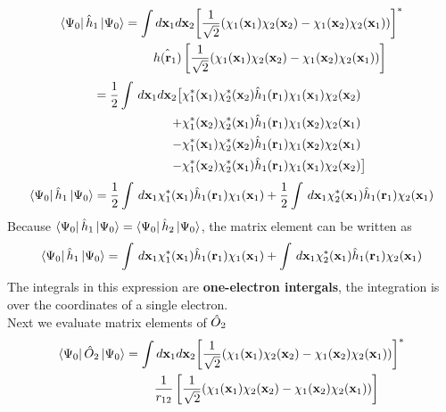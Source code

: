 \documentclass[11pt]{article}
\begin{document}
\begin{align*}
    \bra{\Psi_0}\Hat{h}_1\ket{\Psi_0}=\int&\,d\mathbf{x}_1d\mathbf{x}_2{\left[\frac{1}{\sqrt{2}}(\chi_1(\mathbf{x}_1)\chi_2(\mathbf{x}_2)
    -\chi_1(\mathbf{x}_2)\chi_2(\mathbf{x}_1))\right]}^* \notag \\
    &\Hat{h(\mathbf{r}_1)}\left[\frac{1}{\sqrt{2}}(\chi_1(\mathbf{x}_1)\chi_2(\mathbf{x}_2)
    -\chi_1(\mathbf{x}_2)\chi_2(\mathbf{x}_1))\right] \notag \\
\end{align*}
\begin{align*}
    =\frac{1}{2}\int\,d\mathbf{x}_1d\mathbf{x}_2\big[&\chi_1^*(\mathbf{x}_1)\chi_2^*(\mathbf{x}_2)\Hat{h}_1(\mathbf{r}_1)\chi_1(\mathbf{x}_1)\chi_2(\mathbf{x}_2)\notag \\
    +&\chi_1^*(\mathbf{x}_2)\chi_2^*(\mathbf{x}_1)\Hat{h}_1(\mathbf{r}_1)\chi_1(\mathbf{x}_2)\chi_2(\mathbf{x}_1)\notag \\
    -&\chi_1^*(\mathbf{x}_1)\chi_2^*(\mathbf{x}_2)\Hat{h}_1(\mathbf{r}_1)\chi_1(\mathbf{x}_2)\chi_2(\mathbf{x}_1)\notag \\
    -&\chi_1^*(\mathbf{x}_2)\chi_2^*(\mathbf{x}_1)\Hat{h}_1(\mathbf{r}_1)\chi_1(\mathbf{x}_1)\chi_2(\mathbf{x}_2)\big]
\end{align*}
\begin{equation}
    \bra{\Psi_0}\Hat{h}_1\ket{\Psi_0}=\frac{1}{2}\int\,d\mathbf{x}_1\chi_1^*(\mathbf{x}_1)\Hat{h}_1(\mathbf{r}_1)\chi_1(\mathbf{x}_1)+
    \frac{1}{2}\int\,d\mathbf{x}_1\chi_2^*(\mathbf{x}_1)\Hat{h}_1(\mathbf{r}_1)\chi_2(\mathbf{x}_1)
\end{equation}
Because $\bra{\Psi_0}\Hat{h}_1\ket{\Psi_0}=\bra{\Psi_0}\Hat{h}_2\ket{\Psi_0}$, the matrix element can be written as
\begin{equation}
    \bra{\Psi_0}\Hat{h}_1\ket{\Psi_0}=\int\,d\mathbf{x}_1\chi_1^*(\mathbf{x}_1)\Hat{h}_1(\mathbf{r}_1)\chi_1(\mathbf{x}_1)+
    \int\,d\mathbf{x}_1\chi_2^*(\mathbf{x}_1)\Hat{h}_1(\mathbf{r}_1)\chi_2(\mathbf{x}_1)
\end{equation}
The integrals in this expression are \textbf{one-electron intergals}, the integration is over the coordinates of a single electron.\\
Next we evaluate matrix elements of $\Hat{O}_2$
\begin{align*}
    \bra{\Psi_0}\Hat{O}_2\ket{\Psi_0}=\int&\,d\mathbf{x}_1d\mathbf{x}_2{\left[\frac{1}{\sqrt{2}}(\chi_1(\mathbf{x}_1)\chi_2(\mathbf{x}_2)
    -\chi_1(\mathbf{x}_2)\chi_2(\mathbf{x}_1))\right]}^* \notag \\
    &\frac{1}{r_{12}}\left[\frac{1}{\sqrt{2}}(\chi_1(\mathbf{x}_1)\chi_2(\mathbf{x}_2)
    -\chi_1(\mathbf{x}_2)\chi_2(\mathbf{x}_1))\right] \notag \\
\end{align*}
\end{document}
